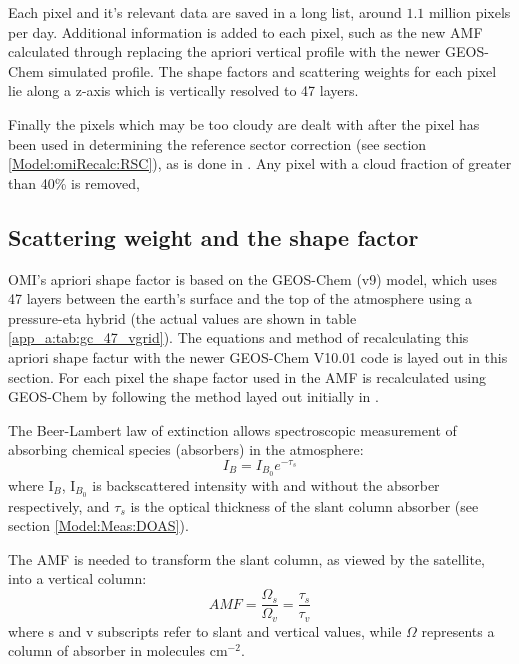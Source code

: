     Each pixel and it's relevant data are saved in a long list, around $1.1$ million pixels per day.
    Additional information is added to each pixel, such as the new AMF calculated through replacing the apriori vertical profile with the newer GEOS-Chem simulated profile.
    The shape factors and scattering weights for each pixel lie along a z-axis which is vertically resolved to 47 layers.
    
    
    Finally the pixels which may be too cloudy are dealt with after the pixel has been used in determining the reference sector correction (see section \ref{Model:omiRecalc:RSC}), as is done in \textcite{Abad2015, DeSmedt2015}.
    Any pixel with a cloud fraction of greater than 40\% is removed, 
  
  \subsection{Scattering weight and the shape factor}
    \label{Model:omiRecalc:ShapeFactor}
    OMI's apriori shape factor is based on the GEOS-Chem (v9) model, which uses 47 layers between the earth's surface and the top of the atmosphere using a pressure-eta hybrid (the actual values are shown in table \ref{app_a:tab:gc_47_vgrid}).
    The equations and method of recalculating this apriori shape factur with the newer GEOS-Chem V10.01 code is layed out in this section.
    For each pixel the shape factor used in the AMF is recalculated using GEOS-Chem by following the method layed out initially in \textcite{Palmer2001}.
    
    The Beer-Lambert law of extinction allows spectroscopic measurement of absorbing chemical species (absorbers) in the atmosphere:
    \begin{equation} \label{ch_HCHO:eqn:beerlambert}
    I_B = I_{B_0} e^{-\tau_s}
    \end{equation}
    where I$_B$, I$_{B_0}$ is backscattered intensity with and without the absorber respectively, and $\tau_s$ is the optical thickness of the slant column absorber (see section \ref{Model:Meas:DOAS}).
    
    The AMF is needed to transform the slant column, as viewed by the satellite, into a vertical column:
    \begin{equation} \label{ch_HCHO:eqn:AMFratio}
    AMF = \frac{\Omega_s}{\Omega_v} = \frac{\tau_s}{\tau_v}
    \end{equation}
    where s and v subscripts refer to slant and vertical values, while $\Omega$ represents a column of absorber in molecules cm$^{-2}$.
    

